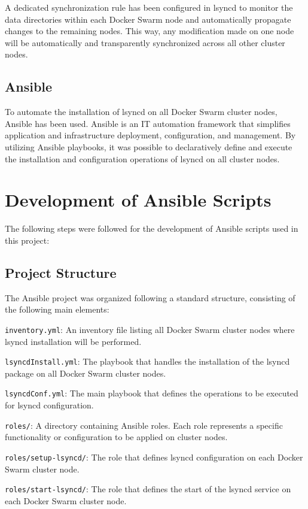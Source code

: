 \documentclass[a4paper, 12pt]{article}
\newenvironment{packed_itemize}{
\begin{itemize}
        \setlength{\itemsep}{1pt}
        \setlength{\parskip}{0pt}
        \setlength{\parsep}{0pt}
}{\end{itemize}}
\begin{document}
A dedicated synchronization rule has been configured in lsyncd to monitor the data 
directories within each Docker Swarm node and automatically propagate changes to the 
remaining nodes. This way, any modification made on one node will be automatically 
and transparently synchronized across all other cluster nodes.

\subsection{Ansible}
To automate the installation of lsyncd on all Docker Swarm cluster nodes, 
Ansible has been used. Ansible is an IT automation framework that simplifies 
application and infrastructure deployment, configuration, and management. 
By utilizing Ansible playbooks, it was possible to declaratively define and execute 
the installation and configuration operations of lsyncd on all cluster nodes.

\newpage
\section{Development of Ansible Scripts}
The following steps were followed for the development of Ansible scripts used in this project:

\subsection{Project Structure}
The Ansible project was organized following a standard structure, consisting of the following main
elements:
\begin{packed_itemize}
  \item \texttt{inventory.yml}: An inventory file listing all Docker Swarm 
    cluster nodes where lsyncd installation will be performed.
  \item \texttt{lsyncdInstall.yml}: The playbook that handles the installation 
    of the lsyncd package on all Docker Swarm cluster nodes.
  \item \texttt{lsyncdConf.yml}: The main playbook that defines the operations 
    to be executed for lsyncd configuration.
  \item \texttt{roles/}: A directory containing Ansible roles. 
    Each role represents a specific functionality or configuration to be applied on cluster nodes.
  \item \texttt{roles/setup-lsyncd/}: The role that defines lsyncd configuration 
    on each Docker Swarm cluster node.
  \item \texttt{roles/start-lsyncd/}: The role that defines the start of the lsyncd 
    service on each Docker Swarm cluster node.
\end{packed_itemize}
\end{document}
